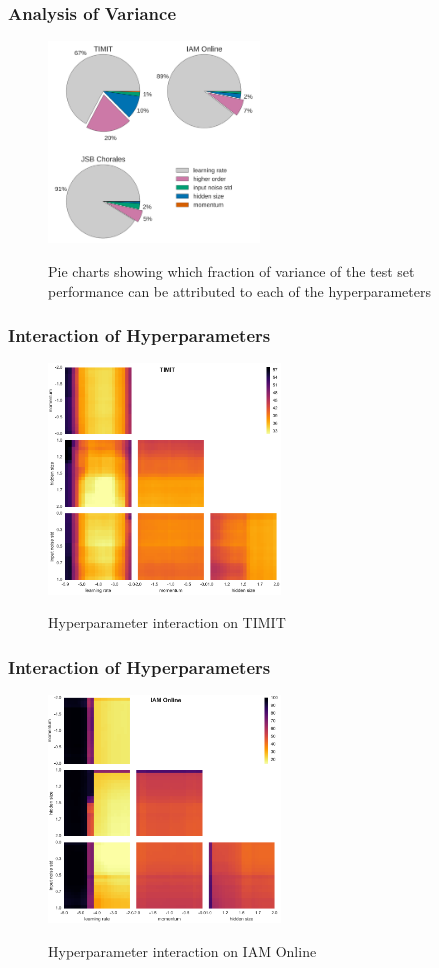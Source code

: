 \documentclass{beamer}
\begin{document}
\begin{frame}
\frametitle{Analysis of Variance}
\begin{figure}
        {\includegraphics[width=0.5\textwidth]{variance_analysis.png}}
        \caption{Pie charts showing which fraction of variance of the test set performance can be attributed to each of the hyperparameters}
    \end{figure}
\end{frame}

\begin{frame}
\frametitle{Interaction of Hyperparameters}
\begin{figure}	
        {\includegraphics[width=0.55\textwidth]{timit_variance.png}}
        \caption{Hyperparameter interaction on TIMIT}
    \end{figure}
\end{frame}

\begin{frame}
\frametitle{Interaction of Hyperparameters}
\begin{figure}
        {\includegraphics[width=0.55\textwidth]{iam_variance.png}}
        \caption{Hyperparameter interaction on IAM Online}
    \end{figure}
\end{frame}
\end{document}
